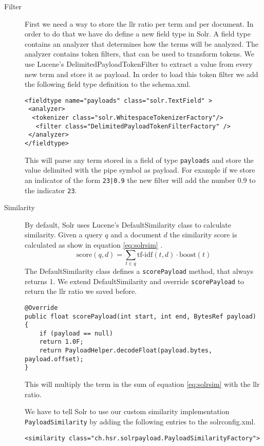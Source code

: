 \begin{description}
\item[Filter] First we need a way to store the \gls{llr} ratio per term and per document. In order to do that we have do define a new field type in Solr. A field type contains an analyzer that determines how the terms will be analyzed. The analyzer contains token filters, that can be used to transform tokens. We use Lucene's DelimitedPayloadTokenFilter to extract a value from every new term and store it as payload. In order to load this token filter we add the following field type definition to the schema.xml.
\begin{lstlisting}[caption={Fieldtype definition for field with payload.}]
<fieldtype name="payloads" class="solr.TextField" >
 <analyzer>
  <tokenizer class="solr.WhitespaceTokenizerFactory"/>
   <filter class="DelimitedPayloadTokenFilterFactory" />
 </analyzer>
</fieldtype>
\end{lstlisting}
This will parse any term stored in a field of type \verb|payloads| and store the value delimited with the pipe symbol as payload. For example if we store an indicator of the form \verb-23|0.9- the new filter will add the number 0.9 to the indicator \verb|23|.
\item[Similarity] By default, Solr uses Lucene's DefaultSimilarity class to calculate similarity. Given a query $q$ and a document $d$ the similarity score is calculated as show in equation \ref{eq:solrsim} \cite{grainger}.
\begin{equation}
\label{eq:solrsim}
\text{score}(q,d) = \sum_{t \in q} \text{tf-idf}(t,d) \cdot \text{boost}(t) 
\end{equation}
The DefaultSimilarity class defines a \verb|scorePayload| method, that always returns 1. We extend DefaultSimilarity and override \verb|scorePayload| to return the \gls{llr} ratio we saved before.
\begin{lstlisting}
@Override
public float scorePayload(int start, int end, BytesRef payload) {
    if (payload == null)
	return 1.0F;
    return PayloadHelper.decodeFloat(payload.bytes, payload.offset);
}
\end{lstlisting}
This will multiply the term in the sum of equation \ref{eq:solrsim} with the \gls{llr} ratio.

We have to tell Solr to use our custom similarity implementation \verb|PayloadSimilarity| by adding the following entries to the solrconfig.xml.
\begin{lstlisting}
<similarity class="ch.hsr.solrpayload.PayloadSimilarityFactory">
\end{lstlisting}
\end{description}
